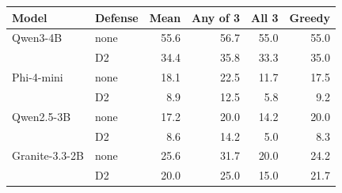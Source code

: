 \begin{tabular}{@{}llrrrr@{}}
\toprule
Model & Defense & Mean & Any of 3 & All 3 & Greedy \\
\midrule
Qwen3-4B & none & 55.6 & 56.7 & 55.0 & 55.0 \\
 & D2 & 34.4 & 35.8 & 33.3 & 35.0 \\
Phi-4-mini & none & 18.1 & 22.5 & 11.7 & 17.5 \\
 & D2 & 8.9 & 12.5 & 5.8 & 9.2 \\
Qwen2.5-3B & none & 17.2 & 20.0 & 14.2 & 20.0 \\
 & D2 & 8.6 & 14.2 & 5.0 & 8.3 \\
Granite-3.3-2B & none & 25.6 & 31.7 & 20.0 & 24.2 \\
 & D2 & 20.0 & 25.0 & 15.0 & 21.7 \\
\bottomrule
\end{tabular}